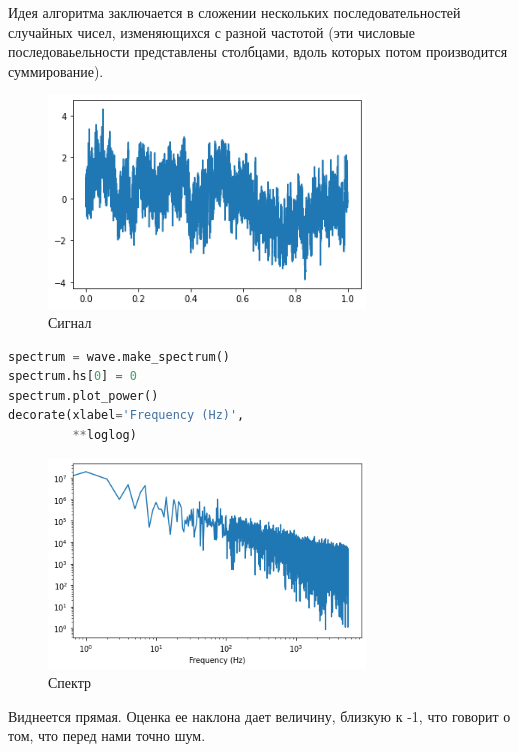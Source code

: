 \documentclass[a4paper,12pt]{report}
\begin{document}
    Идея алгоритма заключается в сложении нескольких последовательностей случайных чисел, изменяющихся с разной частотой (эти числовые последоваьельности представлены столбцами, вдоль которых потом производится суммирование).

    \begin{figure}[H]
        \centering
        \includegraphics[width=0.75\textwidth]{ex5_wave}
        \caption{Сигнал}
        \label{fig:ex5_wave}
    \end{figure}
    
\begin{lstlisting}[language=Python,caption=Спектр]
spectrum = wave.make_spectrum()
spectrum.hs[0] = 0
spectrum.plot_power()
decorate(xlabel='Frequency (Hz)',
         **loglog)
\end{lstlisting}

    \begin{figure}[H]
        \centering
        \includegraphics[width=0.75\textwidth]{ex5_spectrum}
        \caption{Спектр}
        \label{fig:ex5_spectrum}
    \end{figure}
    
    Виднеется прямая. Оценка ее наклона дает величину, близкую к -1, что говорит о том, что перед нами точно  шум.
    
    \printbibliography
    
\end{document}
